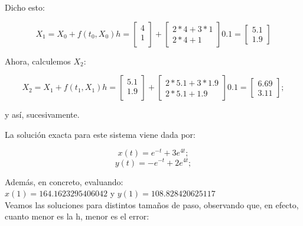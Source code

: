 \documentclass[12pt]{article}       %
\begin{document}
Dicho esto:

\begin{equation*}
X_1=X_0+f(t_0,X_0)h=\begin{bmatrix}
4\\
1\\
\end{bmatrix} + \begin{bmatrix}
2*4 +3*1\\
2*4 + 1
\end{bmatrix}0.1=\begin{bmatrix}
5.1\\
1.9
\end{bmatrix}  
\end{equation*}

Ahora, calculemos $X_2$:

\begin{equation*}
X_2=X_1+f(t_1,X_1)h=\begin{bmatrix}
5.1\\
1.9\\
\end{bmatrix} + \begin{bmatrix}
2*5.1 +3*1.9\\
2*5.1 + 1.9
\end{bmatrix}0.1=\begin{bmatrix}
6.69\\
3.11
\end{bmatrix}  ;
\end{equation*}

y así, sucesivamente.

La solución exacta para este sistema viene dada por:

$$
x(t)=e^{-t}+3e^{4t};
$$
$$
y(t)= -e^{-t}+2e^{4t};
$$

Además, en concreto, evaluando:\\

$x(1)= 164.1623295406042$ y $y(1)=108.828420625117$\\

Veamos las soluciones para distintos tamaños de paso, observando que, en efecto, cuanto menor es la h, menor es el error:

	
\end{document}
